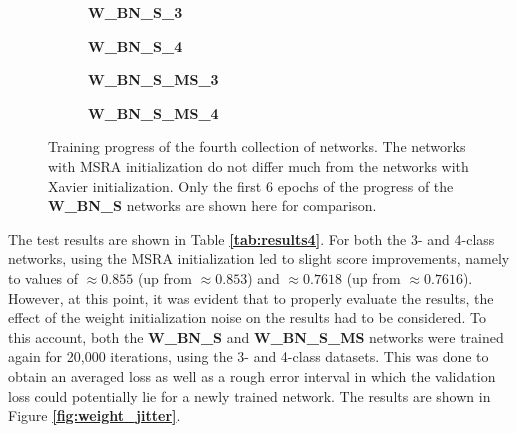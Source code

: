 \begin {figure}[!htb]
	\begin {subfigure}[b]{0.4\linewidth}
		\scalebox{0.65}{}
		\caption{\textbf{W\_BN\_S\_3}}
	\end {subfigure}\hspace{1.75cm}
	\begin {subfigure}[b]{0.4\linewidth}
		\scalebox{0.65}{}
		\caption{\textbf{W\_BN\_S\_4}}
	\end {subfigure}

	\begin {subfigure}[b]{0.4\linewidth}
		\scalebox{0.65}{}
		\caption{\textbf{W\_BN\_S\_MS\_3}}
	\end {subfigure}\hspace{1.75cm}
	\begin {subfigure}[b]{0.4\linewidth}
		\scalebox{0.65}{}
		\caption{\textbf{W\_BN\_S\_MS\_4}}
	\end {subfigure}

		\caption[Training progress of the fourth collection of networks.]{Training progress of the fourth collection of networks. The networks with MSRA initialization do not differ much from the networks with Xavier initialization. Only the first 6 epochs of the progress of the \textbf{W\_BN\_S} networks are shown here for comparison.}
		\label{fig:weighted_batchnorm_shuffle_msra_training}
\end {figure}


The test results are shown in Table \textbf{\ref{tab:results4}}. For both the 3- and 4-class networks, using the MSRA initialization led to slight score improvements, namely to values of $\approx0.855$ (up from $\approx0.853$) and $\approx0.7618$ (up from $\approx0.7616$). However, at this point, it was evident that to properly evaluate the results, the effect of the weight initialization noise on the results had to be considered. To this account, both the \textbf {W\_BN\_S} and \textbf{W\_BN\_S\_MS} networks were trained again for 20,000 iterations, using the 3- and 4-class datasets. This was done to obtain an averaged loss as well as a rough error interval in which the validation loss could potentially lie for a newly trained network. The results are shown in Figure \textbf{\ref{fig:weight_jitter}}.

